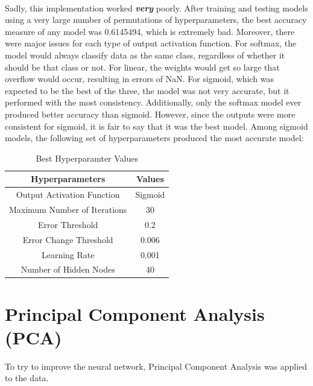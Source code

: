 \documentclass[12pt]{article}
\begin{document}
	\paragraph{}
	Sadly, this implementation worked \textbf{\textit{very}} poorly. After training and testing models using a very large number of permutations of hyperparameters, the best accuracy measure of any model was 0.6145494, which is extremely bad. Moreover, there were major issues for each type of output activation function. For softmax, the model would always classify data as the same class, regardless of whether it should be that class or not. For linear, the weights would get so large that overflow would occur, resulting in errors of NaN. For sigmoid, which was expected to be the best of the three, the model was not very accurate, but it performed with the most consistency. Additionally, only the softmax model ever produced better accuracy than sigmoid. However, since the outputs were more consistent for sigmoid, it is fair to say that it was the best model. Among sigmoid models, the following set of hyperparameters produced the most accurate model:
	\begin{table}[H]
		\centering
		\begin{tabular}{|c | c|}
			\hline
			Hyperparameters & Values\\ \hline
			Output Activation Function & Sigmoid \\
			Maximum Number of Iterations & 30 \\
			Error Threshold & 0.2 \\
			Error Change Threshold & 0.006 \\
			Learning Rate & 0.001 \\
			Number of Hidden Nodes & 40 \\ \hline
		\end{tabular}
		\caption{Best Hyperparamter Values}\label{hyper}
	\end{table}
	
	\section{Principal Component Analysis (PCA)}
	To try to improve the neural network, Principal Component Analysis was applied to the data.
\end{document}
